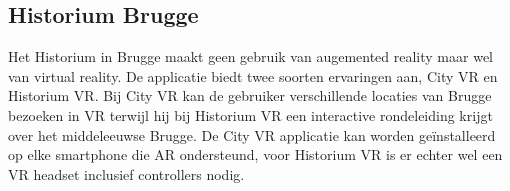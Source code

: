 \subsection{Historium Brugge}
Het Historium in Brugge maakt geen gebruik van augemented reality maar wel van virtual reality. De applicatie biedt twee soorten ervaringen aan, City VR en Historium VR. Bij City VR kan de gebruiker verschillende locaties van Brugge bezoeken in VR terwijl hij bij Historium VR een interactive rondeleiding krijgt over het middeleeuwse Brugge. De City VR applicatie kan worden geïnstalleerd op elke smartphone die AR ondersteund, voor Historium VR is er echter wel een VR headset inclusief controllers nodig. 
